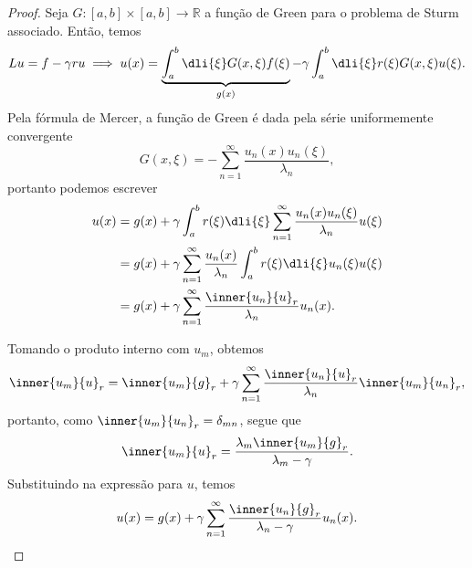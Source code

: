 \begin{proof}
    Seja \(G : [a,b]\times[a,b] \to \mathbb{R}\) a função de Green para o problema de Sturm associado. Então, temos
    \begin{equation*}
        Lu = f - \gamma r u \implies u(x) = \underbrace{\int_a^b \dli{\xi} G(x, \xi) f(\xi)}_{g(x)} - \gamma \int_a^b \dli{\xi} r(\xi)G(x,\xi) u(\xi).
    \end{equation*}
    Pela fórmula de Mercer, a função de Green é dada pela série uniformemente convergente
    \begin{equation*}
        G(x,\xi) = -\sum_{n = 1}^\infty \frac{u_n(x)u_n(\xi)}{\lambda_n},
    \end{equation*}
    portanto podemos escrever
    \begin{align*}
        u(x) &= g(x) + \gamma \int_{a}^{b} r(\xi) \dli{\xi} \sum_{n = 1}^\infty \frac{u_n(x)u_n(\xi)}{\lambda_n} u(\xi)\\
             &= g(x) + \gamma \sum_{n=1}^\infty \frac{u_n(x)}{\lambda_n} \int_{a}^{b} r(\xi)\dli{\xi} u_n(\xi)u(\xi)\\
             &= g(x) + \gamma \sum_{n=1}^\infty \frac{\inner{u_n}{u}_r}{\lambda_n}u_n(x).
    \end{align*}

    Tomando o produto interno com \(u_m\), obtemos
    \begin{equation*}
        \inner{u_m}{u}_r = \inner{u_m}{g}_r + \gamma \sum_{n = 1}^\infty \frac{\inner{u_n}{u}_r}{\lambda_n} \inner{u_m}{u_n}_r,
    \end{equation*}
    portanto, como \(\inner{u_m}{u_n}_r = \delta_{mn}\), segue que
    \begin{equation*}
        \inner{u_m}{u}_r = \frac{\lambda_m \inner{u_m}{g}_r}{\lambda_m - \gamma}.
    \end{equation*}
    Substituindo na expressão para \(u\), temos
    \begin{equation*}
        u(x) = g(x) + \gamma \sum_{n = 1}^\infty \frac{\inner{u_n}{g}_r}{\lambda_n - \gamma}u_n(x).
    \end{equation*}


\end{proof}
